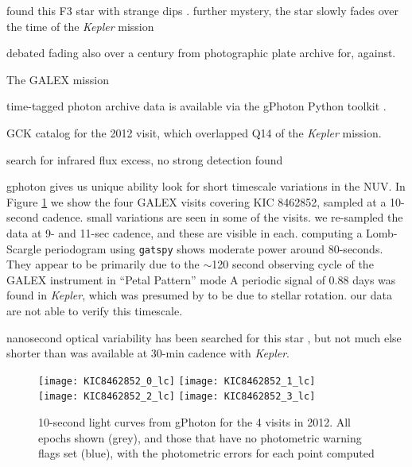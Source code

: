 \documentclass[manuscript, letterpaper]{aastex6}
\makeatletter
\let\origsection\section
\renewcommand\section{\@ifstar{\starsection}{\nostarsection}}
\newcommand\nostarsection[1]{\sectionprelude\origsection{#1}}
\newcommand\starsection[1]{\sectionprelude\origsection*{#1}}
\newcommand\sectionprelude{\vspace{1em}}
\newcommand{\Kepler}{\textsl{Kepler}\xspace}
\makeatother
\begin{document}
found this F3 star with strange dips \citet{boyajian2015}. further mystery, the star slowly fades over the time of the \Kepler mission \citet{montet2016}

debated fading also over a century from photographic plate archive \citet{schaefer2016} for, \citet{hippke2016} against.



The GALEX mission \citep{galex}

time-tagged photon archive data \citep{million2016} is available via the gPhoton Python toolkit \citep{gphoton}.

GCK catalog \citep{olmedo2015} for the 2012 visit, which overlapped Q14 of the \Kepler mission.




search for infrared flux excess, no strong detection found
\citep{marengo2015}


\section{Short Timescale Variability}

gphoton gives us unique ability look for short timescale variations in the NUV.  In Figure \ref{fig:shorttime} we show the four GALEX visits covering KIC 8462852, sampled at a 10-second cadence. small variations are seen in some of the visits. we re-sampled the data at 9- and 11-sec cadence, and these are visible in each. computing a Lomb-Scargle periodogram using {\tt gatspy} \citep{gatspy} shows moderate power around 80-seconds. They appear to be primarily due to the $\sim$120 second observing cycle of the GALEX instrument in ``Petal Pattern'' mode 
A periodic signal of 0.88 days was found in \Kepler, which was presumed by \citet{boyajian2015} to be due to stellar rotation. our data are not able to verify this timescale.

nanosecond optical variability has been searched for this star \citep{abeysekara2016}, but not much else shorter than was available at 30-min cadence with \Kepler.


\begin{figure}[]
\centering
\texttt{[image: KIC8462852\_0\_lc]}
\texttt{[image: KIC8462852\_1\_lc]}\\
\texttt{[image: KIC8462852\_2\_lc]}
\texttt{[image: KIC8462852\_3\_lc]}
\caption{
10-second light curves from gPhoton for the 4 visits in 2012. All epochs shown (grey), and those that have no photometric warning flags set (blue), with the photometric errors for each point computed}
\label{fig:shorttime}
\end{figure}
\end{document}
